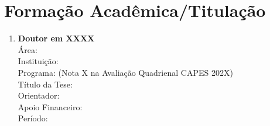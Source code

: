 \section{Formação Acadêmica/Titulação}

\begin{enumerate}
	\item \textbf{Doutor em XXXX}\\
	Área: \\
	Instituição: \\
	Programa: (Nota X na Avaliação Quadrienal CAPES 202X)\\
	Título da Tese: \\
	Orientador: \\
	Apoio Financeiro: \\
	Período:
\end{enumerate}
